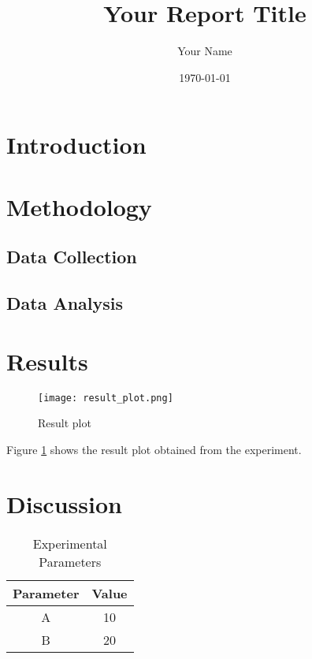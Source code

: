 \documentclass{article}
\title{Your Report Title}
\author{Your Name}
\date{\today}
\begin{document}
\maketitle

\tableofcontents
\newpage

\section{Introduction}
\lipsum[1-2] %

\section{Methodology}
\lipsum[3] %

\subsection{Data Collection}
\lipsum[4] %

\subsection{Data Analysis}
\lipsum[5] %

\section{Results}
\lipsum[6] %

\begin{figure}[htb]
    \centering
    \texttt{[image: result\_plot.png]}
    \caption{Result plot}
    \label{fig:result}
\end{figure}

Figure \ref{fig:result} shows the result plot obtained from the experiment.

\section{Discussion}
\lipsum[7] %

\begin{table}[htb]
    \centering
    \begin{tabular}{|c|c|}
        \hline
        \textbf{Parameter} & \textbf{Value} \\
        \hline
        A & 10 \\
        B & 20 \\
        \hline
    \end{tabular}
    \caption{Experimental Parameters}
    \label{table:params}
\end{table}
\end{document}
